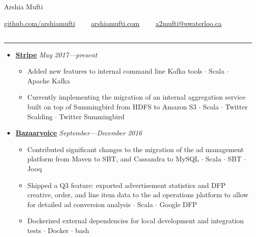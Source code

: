 \documentclass[7pt,letterpaper]{article}
\newcommand{\dt}{$\cdot$ }
\begin{document}
\begin{center}
{\huge Arshia Mufti}


\href{https://github.com/arshiamufti/}{github.com/arshiamufti}\ \ \textbullet
\ \ \href{http://arshiamufti.com}{arshiamufti.com}\ \ \textbullet
\ \ \href{mailto:a2mufti@uwaterloo.ca}{a2mufti@uwaterloo.ca}

\end{center}
\vspace{-2.0em}
\subsection*{}
\hrule
\vspace{1.0em}
  \begin{itemize}
    \parskip=-0.5em
  \itemsep0.7em

    \item[]
    {\href{https://stripe.com}{\textbf{Stripe}} \hfill
      \emph{May 2017---present}}

    \begin{itemize}[label=\textbullet]
      \itemsep0em
      \item Added new features to internal command line Kafka tools \dt Scala 
        \dt Apache Kafka
      \item Currently implementing the migration of an internal aggregation
        service built on top of Summingbird from HDFS to Amazon S3 \dt Scala \dt
        Twitter Scalding \dt Twitter Summingbird
    \end{itemize}

    \item[]
    {\href{http://www.bazaarvoice.com}{\textbf{Bazaarvoice}} \hfill
      \emph{September---December 2016}}

    \begin{itemize}[label=\textbullet]
      \itemsep0em
      \item Contributed significant changes to the migration of the ad
        management platform from Maven to SBT, and Cassandra to MySQL \dt Scala
        \dt SBT \dt Jooq
      \item Shipped a Q3 feature: exported advertisement statistics and DFP
        creative, order, and line item data to the ad operations platform to
        allow for detailed ad conversion analysis \dt Scala \dt Google DFP
      \item Dockerized external dependencies for local development and
        integration tests \dt Docker \dt bash
    \end{itemize}


\end{itemize}
\end{document}
